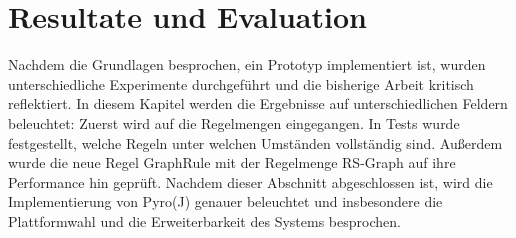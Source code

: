 \chapter{Resultate und Evaluation}

Nachdem die Grundlagen besprochen, ein Prototyp implementiert ist, wurden unterschiedliche Experimente durchgeführt und die bisherige Arbeit kritisch reflektiert. In diesem Kapitel werden die Ergebnisse auf unterschiedlichen Feldern beleuchtet: Zuerst wird auf die Regelmengen eingegangen. In Tests wurde festgestellt, welche Regeln unter welchen Umständen vollständig sind. Außerdem wurde die neue Regel GraphRule mit der Regelmenge RS-Graph auf ihre Performance hin geprüft. Nachdem dieser Abschnitt abgeschlossen ist, wird die Implementierung von Pyro(J) genauer beleuchtet und insbesondere die Plattformwahl und die Erweiterbarkeit des Systems besprochen.











